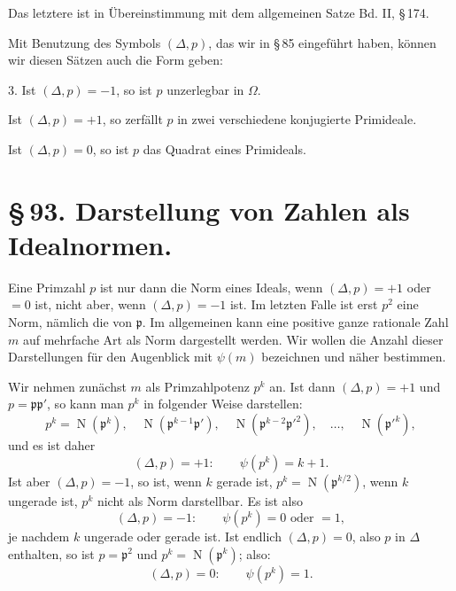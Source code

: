 \documentclass[11pt]{article}
\newcommand{\Norm}{\operatorname{N}}
\begin{document}
Das letztere ist in Übereinstimmung mit dem allgemeinen Satze Bd. II, \S\,174.

Mit Benutzung des Symbols $(\Delta,p)$, das wir in \S\,85 eingeführt haben, können wir diesen Sätzen auch die Form geben:

3. Ist $(\Delta,p)=-1$, so ist $p$ unzerlegbar in $\Omega$.

Ist $(\Delta,p)=+1$, so zerfällt $p$ in zwei verschiedene konjugierte Primideale.

Ist $(\Delta,p)=0$, so ist $p$ das Quadrat eines Primideals.

\section*{\S\,93. Darstellung von Zahlen als Idealnormen.}

Eine Primzahl $p$ ist nur dann die Norm eines Ideals, wenn $(\Delta,p)=+1$ oder $=0$ ist, nicht aber, wenn $(\Delta,p)=-1$ ist. Im letzten Falle ist erst $p^2$ eine Norm, nämlich die von $\mathfrak p$. Im allgemeinen kann eine positive ganze rationale Zahl $m$ auf mehrfache Art als Norm dargestellt werden. Wir wollen die Anzahl dieser Darstellungen für den Augenblick mit $\psi(m)$ bezeichnen und näher bestimmen.

Wir nehmen zunächst $m$ als Primzahlpotenz $p^k$ an. Ist dann $(\Delta,p)=+1$ und $p=\mathfrak p\mathfrak p'$, so kann man $p^k$ in folgender Weise darstellen:
\begin{equation}
p^k=\Norm(\mathfrak p^k),\quad
\Norm(\mathfrak p^{k-1}\mathfrak p'),\quad
\Norm(\mathfrak p^{k-2}\mathfrak p'^2),\quad\ldots,\quad
\Norm(\mathfrak p'^k),
\tag{1}
\end{equation}
und es ist daher
\begin{equation}
(\Delta,p)=+1:\qquad \psi(p^k)=k+1.
\tag{2}
\end{equation}
Ist aber $(\Delta,p)=-1$, so ist, wenn $k$ gerade ist, $p^k=\Norm(\mathfrak p^{k/2})$, wenn $k$ ungerade ist, $p^k$ nicht als Norm darstellbar. Es ist also
\begin{equation}
(\Delta,p)=-1:\qquad \psi(p^k)=0\text{ oder }=1,
\tag{3}
\end{equation}
je nachdem $k$ ungerade oder gerade ist. Ist endlich $(\Delta,p)=0$, also $p$ in $\Delta$ enthalten, so ist $p=\mathfrak p^2$ und $p^k=\Norm(\mathfrak p^k)$; also:
\begin{equation}
(\Delta,p)=0:\qquad \psi(p^k)=1.
\tag{4}
\end{equation}
\end{document}
